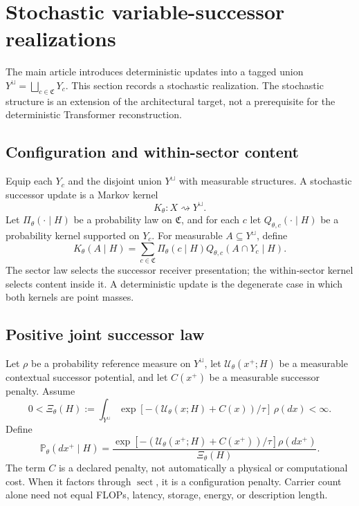 \section{Stochastic variable-successor realizations}\label{supp:stochastic-successor}

The main article introduces deterministic updates into a tagged union $Y^{\sqcup}=\bigsqcup_{c\in\mathfrak C}Y_c$. This section records a stochastic realization. The stochastic structure is an extension of the architectural target, not a prerequisite for the deterministic Transformer reconstruction.

\subsection{Configuration and within-sector content}

Equip each $Y_c$ and the disjoint union $Y^{\sqcup}$ with measurable structures. A stochastic successor update is a Markov kernel
\[
K_\theta:X\rightsquigarrow Y^{\sqcup}.
\]
Let $\Pi_\theta(\cdot\mid H)$ be a probability law on $\mathfrak C$, and for each $c$ let $Q_{\theta,c}(\cdot\mid H)$ be a probability kernel supported on $Y_c$. For measurable $A\subseteq Y^{\sqcup}$, define
\begin{equation}\label{eq:supp-sector-content-factorization}
K_\theta(A\mid H)
=
\sum_{c\in\mathfrak C}
\Pi_\theta(c\mid H)
Q_{\theta,c}(A\cap Y_c\mid H).
\end{equation}
The sector law selects the successor receiver presentation; the within-sector kernel selects content inside it. A deterministic update is the degenerate case in which both kernels are point masses.

\subsection{Positive joint successor law}

Let $\rho$ be a probability reference measure on $Y^{\sqcup}$, let $\mathcal U_\theta(x^+;H)$ be a measurable contextual successor potential, and let $C(x^+)$ be a measurable successor penalty. Assume
\[
0<\Xi_\theta(H)
:=
\int_{Y^{\sqcup}}
\exp[-(\mathcal U_\theta(x;H)+C(x))/\tau] \,\rho(dx)
<\infty.
\]
Define
\begin{equation}\label{eq:supp-joint-successor-law}
\mathbb P_\theta(dx^+\mid H)
=
\frac{
\exp[-(\mathcal U_\theta(x^+;H)+C(x^+))/\tau]\rho(dx^+)
}{
\Xi_\theta(H)
}.
\end{equation}
The term $C$ is a declared penalty, not automatically a physical or computational cost. When it factors through $\operatorname{sect}$, it is a configuration penalty. Carrier count alone need not equal FLOPs, latency, storage, energy, or description length.

